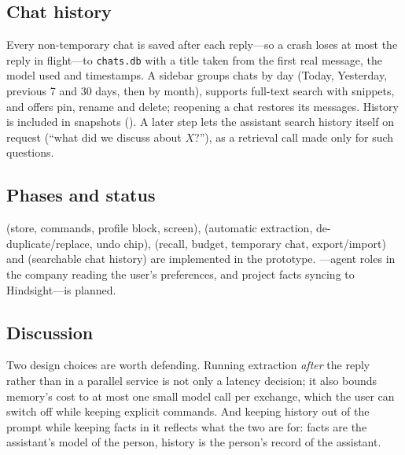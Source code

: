 \subsection{Chat history}

Every non-temporary chat is saved after each reply---so a crash loses at most the reply in flight---to \texttt{chats.db} with a title taken from the first real message, the model used and timestamps. A sidebar groups chats by day (Today, Yesterday, previous 7 and 30 days, then by month), supports full-text search with snippets, and offers pin, rename and delete; reopening a chat restores its messages. History is included in snapshots (). A later step lets the assistant search history itself on request (``what did we discuss about $X$?''), as a retrieval call made only for such questions.

\subsection{Phases and status}

 (store, commands, profile block, screen),  (automatic extraction, de-duplicate/replace, undo chip),  (recall, budget, temporary chat, export/import) and  (searchable chat history) are implemented in the prototype. ---agent roles in the company reading the user's preferences, and project facts syncing to Hindsight---is planned.

\subsection{Discussion}

Two design choices are worth defending. Running extraction \emph{after} the reply rather than in a parallel service is not only a latency decision; it also bounds memory's cost to at most one small model call per exchange, which the user can switch off while keeping explicit commands. And keeping history out of the prompt while keeping facts in it reflects what the two are for: facts are the assistant's model of the person, history is the person's record of the assistant.

